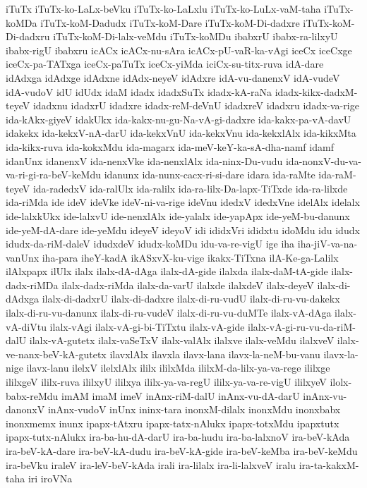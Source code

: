 {iTuTx
iTuTx-ko-LaLx-beVku
iTuTx-ko-LaLxlu
iTuTx-ko-LuLx-vaM-taha
iTuTx-koMDa
iTuTx-koM-Dadudx
iTuTx-koM-Dare
iTuTx-koM-Di-dadxre
iTuTx-koM-Di-dadxru
iTuTx-koM-Di-lalx-veMdu
iTuTx-koMDu
ibabxrU
ibabx-ra-lilxyU
ibabx-rigU
ibabxru
icACx
icACx-nu-sAra
icACx-pU-vaR-ka-vAgi
iceCx
iceCxge
iceCx-pa-TATxga
iceCx-paTuTx
iceCx-yiMda
iciCx-su-titx-ruva
idA-dare
idAdxga
idAdxge
idAdxne
idAdx-neyeV
idAdxre
idA-vu-danenxV
idA-vudeV
idA-vudoV
idU
idUdx
idaM
idadx
idadxSuTx
idadx-kA-raNa
idadx-kikx-dadxM-teyeV
idadxnu
idadxrU
idadxre
idadx-reM-deVnU
idadxreV
idadxru
idadx-va-rige
ida-kAkx-giyeV
idakUkx
ida-kakx-nu-gu-Na-vA-gi-dadxre
ida-kakx-pa-vA-davU
idakekx
ida-kekxV-nA-darU
ida-kekxVnU
ida-kekxVnu
ida-kekxlAlx
ida-kikxMta
ida-kikx-ruva
ida-kokxMdu
ida-magarx
ida-meV-keY-ka-sA-dha-namf
idamf
idanUnx
idanenxV
ida-nenxVke
ida-nenxlAlx
ida-ninx-Du-vudu
ida-nonxV-du-va-va-ri-gi-ra-beV-keMdu
idanunx
ida-nunx-cacx-ri-si-dare
idara
ida-raMte
ida-raM-teyeV
ida-radedxV
ida-ralUlx
ida-ralilx
ida-ra-lilx-Da-lapx-TiTxde
ida-ra-lilxde
ida-riMda
ide
ideV
ideVke
ideV-ni-va-rige
ideVnu
idedxV
idedxVne
idelAlx
idelalx
ide-lalxkUkx
ide-lalxvU
ide-nenxlAlx
ide-yalalx
ide-yapApx
ide-yeM-bu-danunx
ide-yeM-dA-dare
ide-yeMdu
ideyeV
ideyoV
idi
ididxVri
ididxtu
idoMdu
idu
idudx
idudx-da-riM-daleV
idudxdeV
idudx-koMDu
idu-va-re-vigU
ige
iha
iha-jiV-va-na-vanUnx
iha-para
iheY-kadA
ikASxvX-ku-vige
ikakx-TiTxna
ilA-Ke-ga-Lalilx
ilAlxpapx
ilUlx
ilalx
ilalx-dA-dAga
ilalx-dA-gide
ilalxda
ilalx-daM-tA-gide
ilalx-dadx-riMDa
ilalx-dadx-riMda
ilalx-da-varU
ilalxde
ilalxdeV
ilalx-deyeV
ilalx-di-dAdxga
ilalx-di-dadxrU
ilalx-di-dadxre
ilalx-di-ru-vudU
ilalx-di-ru-vu-dakekx
ilalx-di-ru-vu-danunx
ilalx-di-ru-vudeV
ilalx-di-ru-vu-duMTe
ilalx-vA-dAga
ilalx-vA-diVtu
ilalx-vAgi
ilalx-vA-gi-bi-TiTxtu
ilalx-vA-gide
ilalx-vA-gi-ru-vu-da-riM-dalU
ilalx-vA-gutetx
ilalx-vaSeTxV
ilalx-valAlx
ilalxve
ilalx-veMdu
ilalxveV
ilalx-ve-nanx-beV-kA-gutetx
ilavxlAlx
ilavxla
ilavx-lana
ilavx-la-neM-bu-vanu
ilavx-la-nige
ilavx-lanu
ilelxV
ilelxlAlx
ililx
ililxMda
ililxM-da-lilx-ya-va-rege
ililxge
ililxgeV
ililx-ruva
ililxyU
ililxya
ililx-ya-va-regU
ililx-ya-va-re-vigU
ililxyeV
ilolx-babx-reMdu
imAM
imaM
imeV
inAnx-riM-dalU
inAnx-vu-dA-darU
inAnx-vu-danonxV
inAnx-vudoV
inUnx
ininx-tara
inonxM-dilalx
inonxMdu
inonxbabx
inonxmemx
inunx
ipapx-tAtxru
ipapx-tatx-nAlukx
ipapx-totxMdu
ipapxtutx
ipapx-tutx-nAlukx
ira-ba-hu-dA-darU
ira-ba-hudu
ira-ba-lalxnoV
ira-beV-kAda
ira-beV-kA-dare
ira-beV-kA-dudu
ira-beV-kA-gide
ira-beV-keMba
ira-beV-keMdu
ira-beVku
iraleV
ira-leV-beV-kAda
irali
ira-lilalx
ira-li-lalxveV
iralu
ira-ta-kakxM-taha
iri
iroVNa
}
